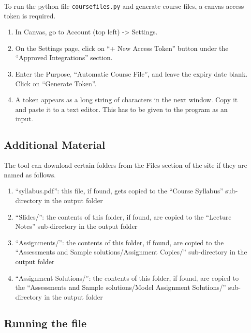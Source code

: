 \documentclass[
]{article}
\providecommand{\tightlist}{%
  \setlength{\itemsep}{0pt}\setlength{\parskip}{0pt}}
\begin{document}
To run the python file \texttt{coursefiles.py} and generate course
files, a canvas access token is required.

\begin{enumerate}
\def\labelenumi{\arabic{enumi}.}
\tightlist
\item
  In Canvas, go to Account (top left) -\textgreater{} Settings.
\item
  On the Settings page, click on ``+ New Access Token'' button under the
  ``Approved Integrations'' section.
\item
  Enter the Purpose, ``Automatic Course File'', and leave the expiry
  date blank. Click on ``Generate Token''.
\item
  A token appears as a long string of characters in the next window.
  Copy it and paste it to a text editor. This has to be given to the
  program as an input.
\end{enumerate}

\hypertarget{additional-material}{%
\subsection{Additional Material}\label{additional-material}}

The tool can download certain folders from the Files section of the site
if they are named as follows.

\begin{enumerate}
\def\labelenumi{\arabic{enumi}.}
\tightlist
\item
  ``syllabus.pdf'': this file, if found, gets copied to the ``Course
  Syllabus'' sub-directory in the output folder
\item
  ``Slides/'': the contents of this folder, if found, are copied to the
  ``Lecture Notes'' sub-directory in the output folder
\item
  ``Assignments/'': the contents of this folder, if found, are copied to
  the ``Assessments and Sample solutions/Assignment Copies/''
  sub-directory in the output folder
\item
  ``Assignment Solutions/'': the contents of this folder, if found, are
  copied to the ``Assessments and Sample solutions/Model Assignment
  Solutions/'' sub-directory in the output folder
\end{enumerate}

\hypertarget{running-the-file}{%
\subsection{Running the file}\label{running-the-file}}
\end{document}
